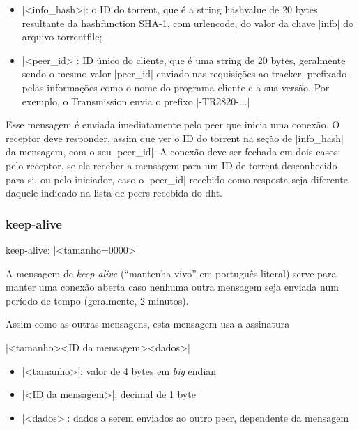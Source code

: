 \begin{itemize}
    \item \bverb|<info_hash>|: o ID do \gls*{torrent}, que é a \gls*{string}
        \gls*{hashvalue} de 20 bytes resultante da \gls*{hashfunction} SHA-1, com
        \gls*{urlencode}, do valor da chave \bverb|info| do arquivo \gls*{torrentfile};

    \item \bverb|<peer_id>|: ID único do cliente, que é uma \gls*{string} de 20 bytes,
        geralmente sendo o mesmo valor \bverb|peer_id| enviado nas requisições ao
        \gls*{tracker}, prefixado pelas informações como o nome do programa cliente e a
        sua versão. Por exemplo, o Transmission envia o prefixo \sverb|-TR2820-...|
\end{itemize}


Esse mensagem é enviada imediatamente pelo \gls*{peer} que inicia uma conexão. O
receptor deve responder, assim que ver o ID do \gls*{torrent} na seção de
\bverb|info_hash| da mensagem, com o seu \bverb|peer_id|. A conexão deve ser fechada em
dois casos: pelo receptor, se ele receber a mensagem para um ID de \gls*{torrent}
desconhecido para si, ou pelo iniciador, caso o \bverb|peer_id| recebido como resposta
seja diferente daquele indicado na lista de \glspl*{peer} recebida do \gls*{dht}.

\subsubsection*{keep-alive}

keep-alive: \bverb|<tamanho=0000>|

A mensagem de \emph{keep-alive} (``mantenha vivo'' em português literal) serve para
manter uma conexão aberta caso nenhuma outra mensagem seja enviada num período de tempo
(geralmente, 2 minutos).

Assim como as outras mensagens, esta mensagem usa a assinatura

\bverb|<tamanho><ID da mensagem><dados>|

\begin{itemize}
    \item \bverb|<tamanho>|: valor de 4 bytes em \emph{big} \gls{endian}

    \item \bverb|<ID da mensagem>|: decimal de 1 byte

    \item \bverb|<dados>|: dados a serem enviados ao outro \gls*{peer}, dependente da
        mensagem
\end{itemize}

